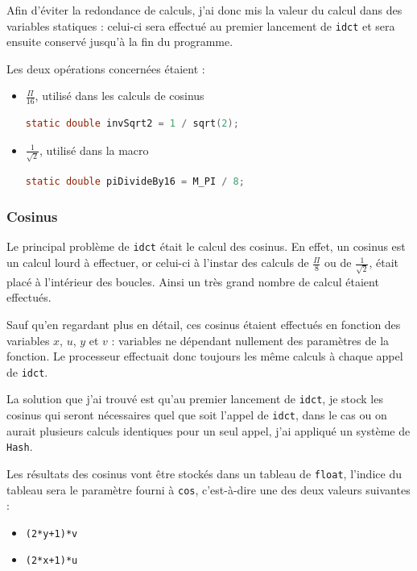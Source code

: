 \documentclass[a4paper, 11pt]{article}
\begin{document}
	Afin d'éviter la redondance de calculs, j'ai donc mis la valeur du calcul dans des variables statiques : celui-ci sera effectué au premier lancement de
	\texttt{idct} et sera ensuite conservé jusqu'à la fin du programme.

	Les deux opérations concernées étaient : 
	\begin{itemize}
		\item $\frac{\Pi}{16}$, utilisé dans les calculs de cosinus
			\begin{lstlisting}[language=C,numbers=none, caption=Déclaration d'une variable contenant $\frac{1}{\sqrt{2}}$]
static double invSqrt2 = 1 / sqrt(2);
\end{lstlisting}
		\item $\frac{1}{\sqrt{2}}$, utilisé dans la macro \texttt{}
			\begin{lstlisting}[language=C,numbers=none, caption=Déclaration d'une variable contenant $\frac{\Pi}{16}$]
static double piDivideBy16 = M_PI / 8;
\end{lstlisting}
	\end{itemize}
	\subsubsection{Cosinus}
	Le principal problème de \texttt{idct} était le calcul des cosinus. En effet, un cosinus est un calcul lourd à effectuer, or celui-ci à l'instar des calculs
	de $\frac{\Pi}{8}$ ou de $\frac{1}{\sqrt{2}}$, était placé à l'intérieur des boucles. Ainsi un très grand nombre de calcul étaient effectués.

	Sauf qu'en regardant plus en détail, ces cosinus étaient effectués en fonction des variables $x$, $u$, $y$ et $v$ : variables ne dépendant nullement des
	paramètres de la fonction. Le processeur effectuait donc toujours les même calculs à chaque appel de \texttt{idct}.

	La solution que j'ai trouvé est qu'au premier lancement de \texttt{idct}, je stock les cosinus qui seront nécessaires quel que soit l'appel de \texttt{idct},
	dans le cas ou on aurait plusieurs calculs identiques pour un seul appel, j'ai appliqué un système de \texttt{Hash}.

	Les résultats des cosinus vont être stockés dans un tableau de \texttt{float}, l'indice du tableau sera le paramètre fourni à \texttt{cos}, c'est-à-dire une
	des deux valeurs suivantes : 
	\begin{itemize}
		\item \texttt{(2*y+1)*v}
		\item \texttt{(2*x+1)*u}
	\end{itemize}
\end{document}
